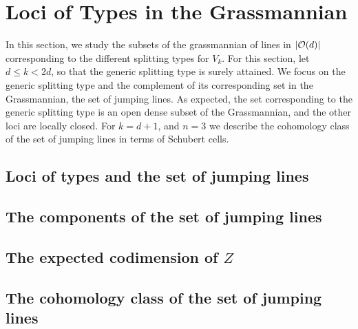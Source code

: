 \section{Loci of Types in the Grassmannian}

In this section, we study the subsets of the grassmannian of lines in $\lvert\mathcal{O}(d)\rvert$ corresponding to the different splitting types for $V_k$. For this section, let $d\leq k < 2d$, so that the generic splitting type is surely attained. We focus on the generic splitting type and the complement of its corresponding set in the Grassmannian, the set of jumping lines. As expected, the set corresponding to the generic splitting type is an open dense subset of the Grassmannian, and the other loci are locally closed. For $k=d+1$, and $n=3$ we describe the cohomology class of the set of jumping lines in terms of Schubert cells.

\subsection{Loci of types and the set of jumping lines}

\subsection{The components of the set of jumping lines}

\subsection{The expected codimension of \texorpdfstring{$Z$}{Z}}

\subsection{The cohomology class of the set of jumping lines}
